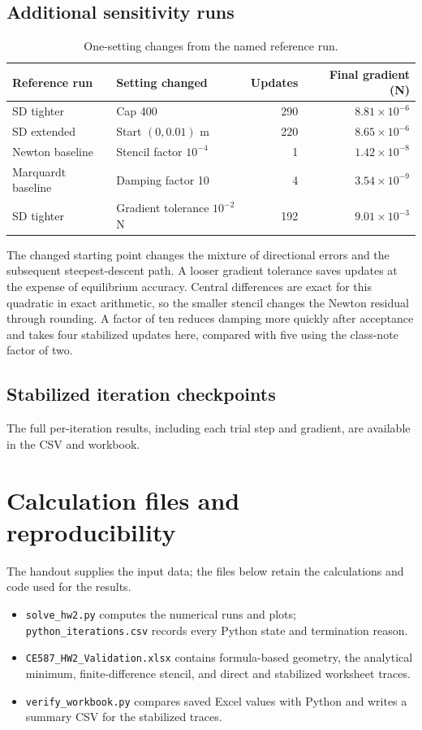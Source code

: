 \documentclass[11pt,a4paper]{article}
\begin{document}
\subsection{Additional sensitivity runs}
\begin{table}[H]
\centering
\caption{One-setting changes from the named reference run.}
\begin{tabular}{llrr}
\toprule
Reference run & Setting changed & Updates & Final gradient (N)\\
\midrule
SD tighter & Cap 400 & 290 & $8.81\times10^{-6}$\\
SD extended & Start $(0,0.01)$ m & 220 & $8.65\times10^{-6}$\\
Newton baseline & Stencil factor $10^{-4}$ & 1 & $1.42\times10^{-8}$\\
Marquardt baseline & Damping factor 10 & 4 & $3.54\times10^{-9}$\\
SD tighter & Gradient tolerance $10^{-2}$ N & 192 & $9.01\times10^{-3}$\\
\bottomrule
\end{tabular}
\end{table}
The changed starting point changes the mixture of directional errors and
the subsequent steepest-descent path. A looser gradient tolerance saves
updates at the expense of equilibrium accuracy. Central differences are
exact for this quadratic in exact arithmetic, so the smaller stencil changes
the Newton residual through rounding. A factor of ten reduces damping more
quickly after acceptance and takes four stabilized updates here, compared
with five using the class-note factor of two.

\subsection{Stabilized iteration checkpoints}

The full per-iteration results, including each trial step and gradient,
are available in the CSV and workbook.


\section{Calculation files and reproducibility}
The handout supplies the input data; the files below retain the calculations and code used for the results.
\begin{itemize}
 \item \texttt{solve\_hw2.py} computes the numerical runs and plots; \texttt{python\_iterations.csv} records every Python state and termination reason.
 \item \texttt{CE587\_HW2\_Validation.xlsx} contains formula-based geometry, the analytical minimum, finite-difference stencil, and direct and stabilized worksheet traces.
 \item \texttt{verify\_workbook.py} compares saved Excel values with Python and writes a summary CSV for the stabilized traces.
\end{itemize}

\end{document}

